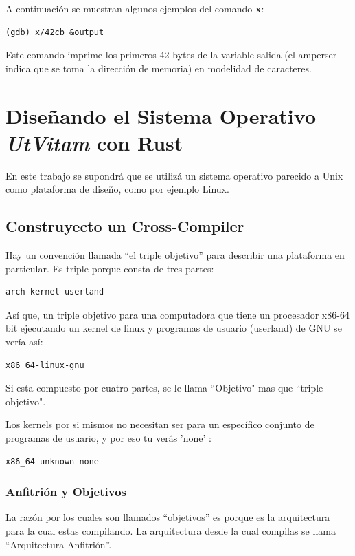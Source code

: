 \documentclass[12pt, twoside]{report}
\begin{document}
A continuación se muestran algunos ejemplos del comando \textbf{x}:
\begin{lstlisting}[language={[x86masm]Assembler}]
(gdb) x/42cb &output
\end{lstlisting}

Este comando imprime los primeros 42 bytes de la variable salida (el amperser indica que se toma la dirección de memoria) en modelidad de caracteres.
\chapter{Diseñando el Sistema Operativo \textbf{\textit{UtVitam}} con Rust}

En este trabajo se supondrá que se utilizá un sistema operativo parecido a Unix como plataforma de diseño, como por ejemplo Linux.

\section{Construyecto un \textbf{Cross-Compiler}}
Hay un convención llamada ``el triple objetivo'' para describir una plataforma en particular. Es triple porque consta de tres partes:

\begin{lstlisting}[language=bash]
arch-kernel-userland
\end{lstlisting}
Así que, un triple objetivo para una computadora que tiene un procesador x86-64 bit ejecutando un kernel de linux y programas de usuario (userland) de GNU se vería así:

\begin{lstlisting}[language=bash]
x86_64-linux-gnu
\end{lstlisting}
Si esta compuesto por cuatro partes, se le llama ``Objetivo" mas que ``triple objetivo".

Los kernels por si mismos no necesitan ser para un específico conjunto de programas de usuario, y por eso tu verás 'none' :

\begin{lstlisting}[language=bash]
x86_64-unknown-none
\end{lstlisting}

\subsection{Anfitrión y Objetivos}

La razón por los cuales son llamados ``objetivos'' es porque es la arquitectura para la cual estas compilando. La arquitectura desde la cual compilas se llama ``Arquitectura Anfitrión''.
\end{document}
